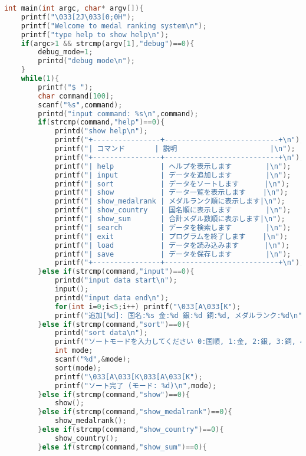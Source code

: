 \documentclass[a4paper,11pt]{jsarticle}
\begin{document}
\begin{lstlisting}[caption=main関数のコード, label=main, language=C]
int main(int argc, char* argv[]){
    printf("\033[2J\033[0;0H");
    printf("Welcome to medal ranking system\n");
    printf("type help to show help\n");
    if(argc>1 && strcmp(argv[1],"debug")==0){
        debug_mode=1;
        printd("debug mode\n");
    }
    while(1){
        printf("$ ");
        char command[100];
        scanf("%s",command);
        printd("input command: %s\n",command);
        if(strcmp(command,"help")==0){
            printd("show help\n");
            printf("+----------------+---------------------------+\n");
            printf("| コマンド       | 説明                      |\n");
            printf("+----------------+---------------------------+\n");
            printf("| help           | ヘルプを表示します        |\n");
            printf("| input          | データを追加します        |\n");
            printf("| sort           | データをソートします      |\n");
            printf("| show           | データ一覧を表示します    |\n");
            printf("| show_medalrank | メダルランク順に表示します|\n");
            printf("| show_country   | 国名順に表示します        |\n");
            printf("| show_sum       | 合計メダル数順に表示します|\n");
            printf("| search         | データを検索します        |\n");
            printf("| exit           | プログラムを終了します    |\n");
            printf("| load           | データを読み込みます      |\n");
            printf("| save           | データを保存します        |\n");
            printf("+----------------+---------------------------+\n");
        }else if(strcmp(command,"input")==0){
            printd("input data start\n");
            input();
            printd("input data end\n");
            for(int i=0;i<5;i++) printf("\033[A\033[K");
            printf("追加[%d]: 国名:%s 金:%d 銀:%d 銅:%d, メダルランク:%d\n",data_size,data[data_size-1].country,data[data_size-1].gold,data[data_size-1].silver,data[data_size-1].bronze,get_medalrank(data_size-1));
        }else if(strcmp(command,"sort")==0){
            printd("sort data\n");
            printf("ソートモードを入力してください 0:国順, 1:金, 2:銀, 3:銅, 4:合計\n>>> ");
            int mode;
            scanf("%d",&mode);
            sort(mode);
            printf("\033[A\033[K\033[A\033[K");            
            printf("ソート完了 (モード: %d)\n",mode);
        }else if(strcmp(command,"show")==0){
            show();
        }else if(strcmp(command,"show_medalrank")==0){
            show_medalrank();
        }else if(strcmp(command,"show_country")==0){
            show_country();
        }else if(strcmp(command,"show_sum")==0){

\end{lstlisting}
\end{document}
